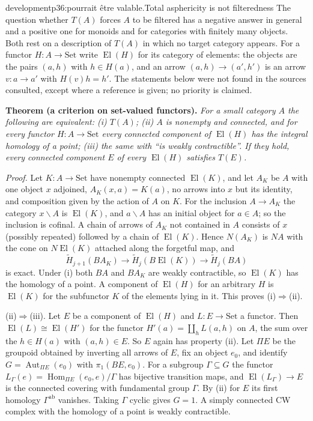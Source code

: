 \begin{dcomment}{development}{p36:pourrait être valable.}{Total asphericity is not filteredness}
The question whether $T(A)$ forces $A$ to be filtered has a negative answer in general and a positive one for monoids and for categories with finitely many objects. Both rest on a description of $T(A)$ in which no target category appears. For a functor $H:A\to\mathrm{Set}$ write $\operatorname{El}(H)$ for its category of elements: the objects are the pairs $(a,h)$ with $h\in H(a)$, and an arrow $(a,h)\to(a',h')$ is an arrow $v:a\to a'$ with $H(v)h=h'$. The statements below were not found in the sources consulted, except where a reference is given; no priority is claimed.

\textbf{Theorem (a criterion on set-valued functors).}\ours
\textit{For a small category $A$ the following are equivalent: (i) $T(A)$; (ii) $A$ is nonempty and connected, and for every functor $H:A\to\mathrm{Set}$ every connected component of $\operatorname{El}(H)$ has the integral homology of a point; (iii) the same with ``is weakly contractible''. If they hold, every connected component $E$ of every $\operatorname{El}(H)$ satisfies $T(E)$.}

\textit{Proof.}
Let $K:A\to\mathrm{Set}$ have nonempty connected $\operatorname{El}(K)$, and let $A_K$ be $A$ with one object $x$ adjoined, $A_K(x,a)=K(a)$, no arrows into $x$ but its identity, and composition given by the action of $A$ on $K$. For the inclusion $A\to A_K$ the category $x\backslash A$ is $\operatorname{El}(K)$, and $a\backslash A$ has an initial object for $a\in A$; so the inclusion is cofinal. A chain of arrows of $A_K$ not contained in $A$ consists of $x$ (possibly repeated) followed by a chain of $\operatorname{El}(K)$. Hence $N(A_K)$ is $NA$ with the cone on $N\operatorname{El}(K)$ attached along the forgetful map, and
\[
 \widetilde H_{j+1}(BA_K)\longrightarrow\widetilde H_j(B\operatorname{El}(K))\longrightarrow\widetilde H_j(BA)
\]
is exact. Under (i) both $BA$ and $BA_K$ are weakly contractible, so $\operatorname{El}(K)$ has the homology of a point. A component of $\operatorname{El}(H)$ for an arbitrary $H$ is $\operatorname{El}(K)$ for the subfunctor $K$ of the elements lying in it. This proves (i)$\Rightarrow$(ii).

(ii)$\Rightarrow$(iii). Let $E$ be a component of $\operatorname{El}(H)$ and $L:E\to\mathrm{Set}$ a functor. Then $\operatorname{El}(L)\cong\operatorname{El}(H')$ for the functor $H'(a)=\coprod_hL(a,h)$ on $A$, the sum over the $h\in H(a)$ with $(a,h)\in E$. So $E$ again has property (ii). Let $\Pi E$ be the groupoid obtained by inverting all arrows of $E$, fix an object $e_0$, and identify $G=\operatorname{Aut}_{\Pi E}(e_0)$ with $\pi_1(BE,e_0)$. For a subgroup $\Gamma\subseteq G$ the functor $L_\Gamma(e)=\operatorname{Hom}_{\Pi E}(e_0,e)/\Gamma$ has bijective transition maps, and $\operatorname{El}(L_\Gamma)\to E$ is the connected covering with fundamental group $\Gamma$. By (ii) for $E$ its first homology $\Gamma^{\mathrm{ab}}$ vanishes. Taking $\Gamma$ cyclic gives $G=1$. A simply connected CW complex with the homology of a point is weakly contractible.


\end{dcomment}
